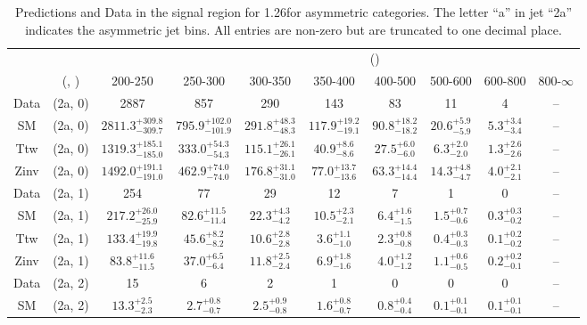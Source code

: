 \begin{table}[h!]
\tiny
\centering
\caption{Predictions and Data in the signal region for 1.26\ifb for asymmetric categories. The letter ``a'' in jet \eg ``2a''  indicates the asymmetric jet bins. All entries are non-zero but are truncated to one decimal place.\label{tab:predall_sig_comb_asym}}
\begin{tabular}
{cccccccccc}
	\hline\hline
&	&	& \multicolumn{8}{c}{\scalht (\gev)}\\ 
	&	 (\njet, \nb) & 200-250 & 250-300 & 300-350 & 350-400 & 400-500 & 500-600 & 600-800 & 800-$\infty$ \\ [0.8ex] 
\hline
	Data & (2a, 0) & 2887 & 857 & 290 & 143 & 83 & 11 & 4 & -- \\[0.5ex] 
	SM & (2a, 0) & $2811.3^{+ 309.8 }_{- 309.7 }$ & $795.9^{+ 102.0 }_{- 101.9 }$ & $291.8^{+ 48.3 }_{- 48.3 }$ & $117.9^{+ 19.2 }_{- 19.1 }$ & $90.8^{+ 18.2 }_{- 18.2 }$ & $20.6^{+ 5.9 }_{- 5.9 }$ & $5.3^{+ 3.4 }_{- 3.4 }$ & -- \\[0.5ex] 
	Ttw & (2a, 0) & $1319.3^{+ 185.1 }_{- 185.0 }$ & $333.0^{+ 54.3 }_{- 54.3 }$ & $115.1^{+ 26.1 }_{- 26.1 }$ & $40.9^{+ 8.6 }_{- 8.6 }$ & $27.5^{+ 6.0 }_{- 6.0 }$ & $6.3^{+ 2.0 }_{- 2.0 }$ & $1.3^{+ 2.6 }_{- 2.6 }$ & -- \\[0.5ex] 
	Zinv & (2a, 0) & $1492.0^{+ 191.1 }_{- 191.0 }$ & $462.9^{+ 74.0 }_{- 74.0 }$ & $176.8^{+ 31.1 }_{- 31.0 }$ & $77.0^{+ 13.7 }_{- 13.6 }$ & $63.3^{+ 14.4 }_{- 14.4 }$ & $14.3^{+ 4.8 }_{- 4.7 }$ & $4.0^{+ 2.1 }_{- 2.1 }$ & -- \\[0.5ex] 
	Data & (2a, 1) & 254 & 77 & 29 & 12 & 7 & 1 & 0 & -- \\[0.5ex] 
	SM & (2a, 1) & $217.2^{+ 26.0 }_{- 25.9 }$ & $82.6^{+ 11.5 }_{- 11.4 }$ & $22.3^{+ 4.3 }_{- 4.2 }$ & $10.5^{+ 2.3 }_{- 2.1 }$ & $6.4^{+ 1.6 }_{- 1.5 }$ & $1.5^{+ 0.7 }_{- 0.6 }$ & $0.3^{+ 0.3 }_{- 0.2 }$ & -- \\[0.5ex] 
	Ttw & (2a, 1) & $133.4^{+ 19.9 }_{- 19.8 }$ & $45.6^{+ 8.2 }_{- 8.2 }$ & $10.6^{+ 2.8 }_{- 2.8 }$ & $3.6^{+ 1.1 }_{- 1.0 }$ & $2.3^{+ 0.8 }_{- 0.8 }$ & $0.4^{+ 0.3 }_{- 0.3 }$ & $0.1^{+ 0.2 }_{- 0.2 }$ & -- \\[0.5ex] 
	Zinv & (2a, 1) & $83.8^{+ 11.6 }_{- 11.5 }$ & $37.0^{+ 6.5 }_{- 6.4 }$ & $11.8^{+ 2.5 }_{- 2.4 }$ & $6.9^{+ 1.8 }_{- 1.6 }$ & $4.0^{+ 1.2 }_{- 1.2 }$ & $1.1^{+ 0.6 }_{- 0.5 }$ & $0.2^{+ 0.2 }_{- 0.1 }$ & -- \\[0.5ex] 
	Data & (2a, 2) & 15 & 6 & 2 & 1 & 0 & 0 & 0 & -- \\[0.5ex] 
	SM & (2a, 2) & $13.3^{+ 2.5 }_{- 2.3 }$ & $2.7^{+ 0.8 }_{- 0.7 }$ & $2.5^{+ 0.9 }_{- 0.8 }$ & $1.6^{+ 0.8 }_{- 0.7 }$ & $0.8^{+ 0.4 }_{- 0.4 }$ & $0.1^{+ 0.1 }_{- 0.1 }$ & $0.1^{+ 0.1 }_{- 0.1 }$ & -- \\[0.5ex] 

\end{tabular}
\end{table}
